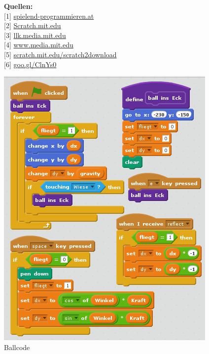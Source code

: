 \textbf{Quellen:} \\
{[}1{]} \href{http://spielend-programmieren.at}{spielend-programmieren.at}\\
{[}2{]} \href{http://scratch.mit.edu}{Scratch.mit.edu}\\
{[}3{]} \href{http://llk.media.mit.edu/}{llk.media.mit.edu}\\
{[}4{]} \href{http://www.media.mit.edu/}{www.media.mit.edu}\\
{[}5{]} \href{http://scratch.mit.edu/scratch2download/}{scratch.mit.edu/scratch2download}\\
{[}6{]} \href{http://spielend-programmieren.at/en:tutorials:centralperspective}{goo.gl/ClnYs0} \\

\begin{center}
\includegraphics[width=0.7\linewidth]{scratch/fballcode.png}\\
\footnotesize{Ballcode}
\end{center}

